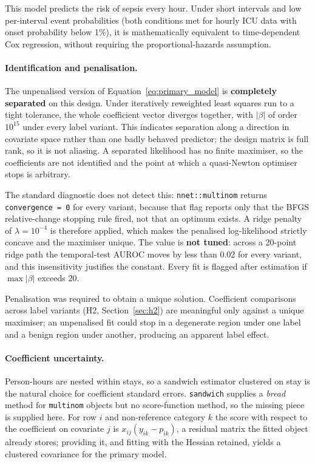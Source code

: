 This model predicts the risk of sepsis every hour. Under short intervals
and low per-interval event probabilities (both conditions met for hourly ICU
data with onset probability below 1\%), it is mathematically equivalent to
time-dependent Cox regression, without requiring the proportional-hazards
assumption.

\paragraph{Identification and penalisation.}
The unpenalised version of Equation~\eqref{eq:primary_model} is
\textbf{completely separated} on this design. Under iteratively reweighted least
squares run to a tight tolerance, the whole coefficient vector diverges
together, with $|\beta|$ of order $10^{15}$ under every label variant. This
indicates separation along a direction in covariate space rather than one badly
behaved predictor; the design matrix is full rank, so it is not aliasing. A
separated likelihood has no finite maximiser, so the coefficients are not
identified and the point at which a quasi-Newton optimiser stops is arbitrary.

The standard diagnostic does not detect this: \texttt{nnet::multinom} returns
\texttt{convergence = 0} for every variant, because that flag reports only that
the BFGS relative-change stopping rule fired, not that an optimum exists. A
ridge penalty of $\lambda = 10^{-4}$ is therefore applied, which makes the
penalised log-likelihood strictly concave and the maximiser unique. The value
is \textbf{not tuned}: across a 20-point ridge path the temporal-test AUROC
moves by less than 0.02 for every variant, and this insensitivity justifies the
constant. Every fit is flagged after estimation if $\max|\beta|$ exceeds 20.

Penalisation was required to obtain a unique solution. Coefficient comparisons
across label variants (H2, Section~\ref{sec:h2}) are meaningful only against a
unique maximiser; an unpenalised fit could stop in a degenerate region under one
label and a benign region under another, producing an apparent label effect.

\paragraph{Coefficient uncertainty.}
Person-hours are nested within stays, so a sandwich estimator clustered on stay
is the natural choice for coefficient standard errors. \texttt{sandwich}
supplies a \emph{bread} method for \texttt{multinom} objects but no
score-function method, so the missing piece is supplied here. For row $i$ and
non-reference category $k$ the score with respect to the coefficient on
covariate $j$ is $x_{ij}(y_{ik} - p_{ik})$, a residual matrix the fitted object
already stores; providing it, and fitting with the Hessian retained, yields a
clustered covariance for the primary model.

